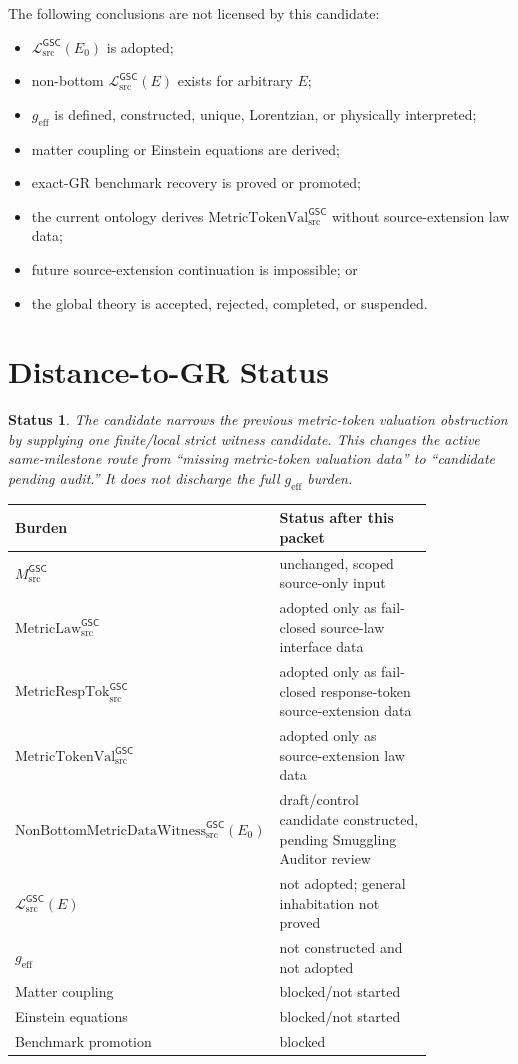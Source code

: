 \documentclass[11pt]{article}
\newcommand{\MsrcGSC}{M_{\mathrm{src}}^{\mathsf{GSC}}}
\newcommand{\MetricLaw}{\mathrm{MetricLaw}_{\mathrm{src}}^{\mathsf{GSC}}}
\newcommand{\MetricRespTok}{\mathrm{MetricRespTok}_{\mathrm{src}}^{\mathsf{GSC}}}
\newcommand{\MetricTokenVal}{\mathrm{MetricTokenVal}_{\mathrm{src}}^{\mathsf{GSC}}}
\newcommand{\Witness}{\mathrm{NonBottomMetricDataWitness}_{\mathrm{src}}^{\mathsf{GSC}}}
\newcommand{\MetricData}{\mathcal{L}_{\mathrm{src}}^{\mathsf{GSC}}}
\newcommand{\geff}{g_{\mathrm{eff}}}
\newcommand{\Ezero}{E_{0}}
\newtheorem{status}{Status}
\begin{document}
The following conclusions are not licensed by this candidate:
\begin{itemize}[leftmargin=*]
  \item \(\MetricData(\Ezero)\) is adopted;
  \item non-bottom \(\MetricData(E)\) exists for arbitrary \(E\);
  \item \(\geff\) is defined, constructed, unique, Lorentzian, or physically
  interpreted;
  \item matter coupling or Einstein equations are derived;
  \item exact-GR benchmark recovery is proved or promoted;
  \item the current ontology derives \(\MetricTokenVal\) without
  source-extension law data;
  \item future source-extension continuation is impossible; or
  \item the global theory is accepted, rejected, completed, or suspended.
\end{itemize}

\section{Distance-to-GR Status}\label{distance-to-gr-status}

\begin{status}
The candidate narrows the previous metric-token valuation obstruction by
supplying one finite/local strict witness candidate. This changes the active
same-milestone route from ``missing metric-token valuation data'' to
``candidate pending audit.'' It does not discharge the full \(\geff\) burden.
\end{status}

\begin{longtable}{p{0.25\linewidth}p{0.58\linewidth}}
\toprule
Burden & Status after this packet \\
\midrule
\(\MsrcGSC\) & unchanged, scoped source-only input \\
\(\MetricLaw\) & adopted only as fail-closed source-law interface data \\
\(\MetricRespTok\) & adopted only as fail-closed response-token
source-extension data \\
\(\MetricTokenVal\) & adopted only as source-extension law data \\
\(\Witness(\Ezero)\) & draft/control candidate constructed, pending
Smuggling Auditor review \\
\(\MetricData(E)\) & not adopted; general inhabitation not proved \\
\(\geff\) & not constructed and not adopted \\
Matter coupling & blocked/not started \\
Einstein equations & blocked/not started \\
Benchmark promotion & blocked \\
\bottomrule
\end{longtable}
\end{document}
